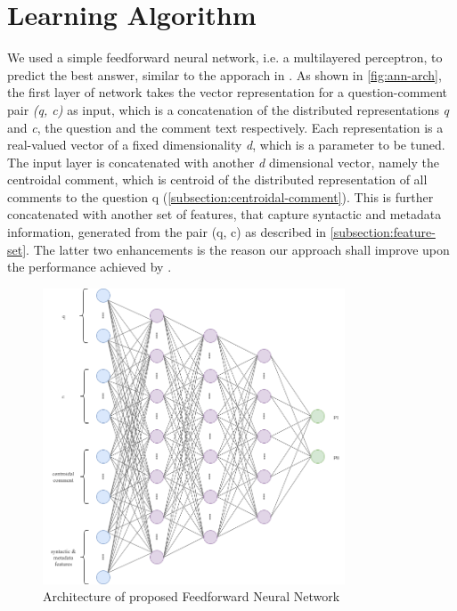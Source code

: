 \documentclass[12pt, a4paper, oneside]{Thesis} %
\begin{document}
\section{Learning Algorithm}
\label{section:learning-algo}

We used a simple feedforward neural network, i.e. a multilayered perceptron, to predict the best answer, similar to the apporach in \cite{bogdanova2016we}. As shown in \autoref{fig:ann-arch}, the first layer of network takes the vector representation for a question-comment pair \textit{(q, c)} as input, which is a concatenation of the distributed representations \textit{q} and \textit{c}, the question and the comment text respectively. Each representation is a real-valued vector of a fixed dimensionality \textit{d}, which is a parameter to be tuned. The input layer is concatenated with another \textit{d} dimensional vector, namely the centroidal comment, which is centroid of the distributed representation of all comments to the question q (\autoref{subsection:centroidal-comment}). This is further concatenated with another set of features, that capture syntactic and metadata information, generated from the pair (q, c) as described in \autoref{subsection:feature-set}. The latter two enhancements is the reason our approach shall improve upon the performance achieved by \cite{bogdanova2016we}.

\begin{figure}[t!]
  \centering
  \includegraphics[keepaspectratio, width=0.8\textwidth]{./Pictures/ann-arch.png}
  \caption{Architecture of proposed Feedforward Neural Network}
  \label{fig:ann-arch}
\end{figure}
\end{document}
